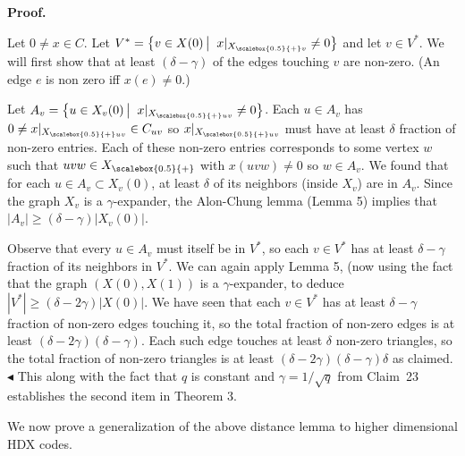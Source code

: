 


\par\medskip\noindent\textbf{Proof.}\par




Let $0\neq x\in C$.
Let $V^{*}=\left\{v\in X(0)\left|\;\vphantom{v\in X(0)x|_{{X}_{\scalebox{0.5}{+}v}}\neq 0}\right.x|_{{X}_{\scalebox{0.5}{+}v}}\neq 0\right\}$ and let $v\in V^{*}$. We will first show that at least $(\delta-\gamma)$ of the edges touching $v$ are non-zero. (An edge $e$ is non zero iff $x(e)\neq 0$.)\par




Let $A_{v}=\left\{u\in X_{v}(0)\left|\;\vphantom{u\in X_{v}(0)x|_{{X}_{\scalebox{0.5}{+}uv}}\neq 0}\right.x|_{{X}_{\scalebox{0.5}{+}uv}}\neq 0\right\}$. Each $u\in A_{v}$ has $0\neq x|_{{X}_{\scalebox{0.5}{+}uv}}\in C_{uv}$ so $x|_{{X}_{\scalebox{0.5}{+}uv}}$ must have at least $\delta$ fraction of non-zero entries. Each of these non-zero entries corresponds to some vertex $w$ such that $uvw\in{X}_{\scalebox{0.5}{+}}$ with $x(uvw)\neq 0$ so $w\in A_{v}$. We found that for each $u\in A_{v}\subset X_{v}(0)$, at least $\delta$ of its neighbors (inside $X_{v}$) are in $A_{v}$. Since the graph $X_{v}$ is a $\gamma$-expander, the Alon-Chung lemma (Lemma 5) implies that $|A_{v}|\geq(\delta-\gamma)\lvert X_{v}(0)\rvert$.\par




Observe that every $u\in A_{v}$ must itself be in $V^{*}$, so each $v\in V^{*}$ has at least $\delta-\gamma$ fraction of its neighbors in $V^{*}$. We can again apply Lemma 5, (now using the fact that the graph $(X(0),X(1))$ is a $\gamma$-expander, to deduce $|V^{*}|\geq(\delta-2\gamma)|X(0)|$. We have seen that each $v\in V^{*}$ has at least $\delta-\gamma$ fraction of non-zero edges touching it, so the total fraction of non-zero edges is at least $(\delta-2\gamma)(\delta-\gamma)$. Each such edge touches at least $\delta$ non-zero triangles, so the total fraction of non-zero triangles is at least $(\delta-2\gamma)(\delta-\gamma)\delta$ as claimed.
$\blacktriangleleft$
This along with the fact that $q$ is constant and $\gamma=1/\sqrt{q}$ from Claim 23 establishes the second item in Theorem 3.\par




We now prove a generalization of the above distance lemma to higher dimensional HDX codes.\par



